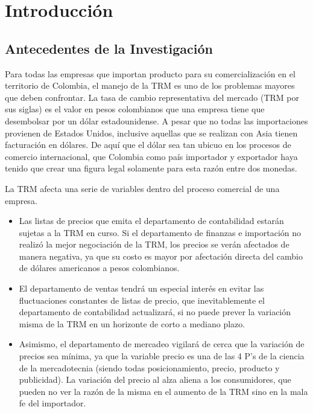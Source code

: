 \setcounter{chapter}{-1}
\chapter{Introducción}
\thispagestyle{empty}

\section{Antecedentes de la Investigación}
Para todas las empresas que importan producto para su comercialización en el territorio de Colombia, el manejo de la TRM es uno de los problemas mayores que deben confrontar. La tasa de cambio representativa del mercado (TRM por sus siglas) es el valor en pesos colombianos que una empresa tiene que desembolsar por un dólar estadounidense. A pesar que no todas las importaciones provienen de Estados Unidos, inclusive aquellas que se realizan con Asia tienen facturación en dólares. De aquí que el dólar sea tan ubicuo en los procesos de comercio internacional, que Colombia como país importador y exportador haya tenido que crear una figura legal solamente para esta razón entre dos monedas.

La TRM afecta una serie de variables dentro del proceso comercial de una empresa.

\begin{itemize}
	\item Las listas de precios que emita el departamento de contabilidad estarán sujetas a la TRM en curso. Si el departamento de finanzas e importación no realizó la mejor negociación de la TRM, los precios se verán afectados de manera negativa, ya que su costo es mayor por afectación directa del cambio de dólares americanos a pesos colombianos.
	\item El departamento de ventas tendrá un especial interés en evitar las fluctuaciones constantes de listas de precio, que inevitablemente el departamento de contabilidad actualizará, si no puede prever la variación misma de la TRM en un horizonte de corto a mediano plazo.
	\item Asimismo, el departamento de mercadeo vigilará de cerca que la variación de precios sea mínima, ya que la variable precio es una de las 4 P’s de la ciencia de la mercadotecnia (siendo todas posicionamiento, precio, producto y publicidad). La variación del precio al alza aliena a los consumidores, que pueden no ver la razón de la misma en el aumento de la TRM sino en la mala fe del importador.
\end{itemize}

